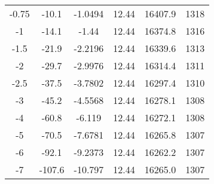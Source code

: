 \begin{table}[!ht]
\begin{tabular}{cccccc}
		-0.75     & -10.1   & -1.0494  & 12.44              & 16407.9            & 1318           \\
		-1        & -14.1   & -1.44    & 12.44              & 16374.8            & 1316           \\
		-1.5      & -21.9   & -2.2196  & 12.44              & 16339.6            & 1313           \\
		-2        & -29.7   & -2.9976  & 12.44              & 16314.4            & 1311           \\
		-2.5      & -37.5   & -3.7802  & 12.44              & 16297.4            & 1310           \\
		-3        & -45.2   & -4.5568  & 12.44              & 16278.1            & 1308           \\
		-4        & -60.8   & -6.119   & 12.44              & 16272.1            & 1308           \\
		-5        & -70.5   & -7.6781  & 12.44              & 16265.8            & 1307           \\
		-6        & -92.1   & -9.2373  & 12.44              & 16262.2            & 1307           \\
		-7        & -107.6  & -10.797  & 12.44              & 16265.0            & 1307           \\ \hline
	\end{tabular}
\end{table}
